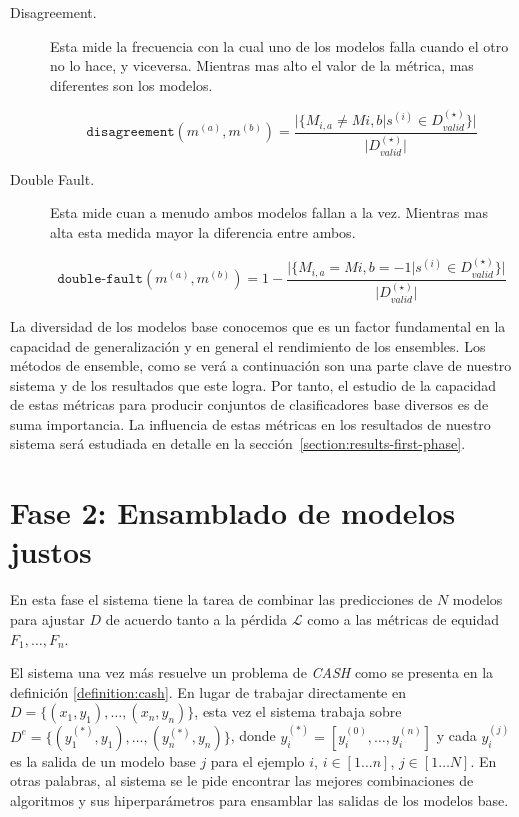 \begin{description}

    \item[Disagreement.]
    Esta mide la frecuencia con la cual uno de los modelos falla cuando el otro no lo hace, y viceversa.
    Mientras mas alto el valor de la métrica, mas diferentes son los modelos.

    \begin{equation}
        \texttt{disagreement}(m^{(a)}, m^{(b)}) = \frac{\vert\{M_{i,a} \neq M{i,b} \vert s^{(i)} \in D^{(\star)}_{valid}\}\vert}{\vert D^{(\star)}_{valid} \vert}
    \end{equation}

    \item[Double Fault.]
    Esta mide cuan a menudo ambos modelos fallan a la vez.
    Mientras mas alta esta medida mayor la diferencia entre ambos.

    \begin{equation}
        \texttt{double-fault}(m^{(a)}, m^{(b)}) = 1 - \frac{\vert\{M_{i,a} = M{i,b} = -1 \vert s^{(i)} \in D^{(\star)}_{valid}\}\vert}{\vert D^{(\star)}_{valid} \vert}
    \end{equation}
    
\end{description}

La diversidad de los modelos base conocemos que es un factor fundamental en la capacidad de generalización y en general el rendimiento de los ensembles.
Los métodos de ensemble, como se verá a continuación son una parte clave de nuestro sistema y de los resultados que este logra.
Por tanto, el estudio de la capacidad de estas métricas para producir conjuntos de clasificadores base diversos es de suma importancia.
La influencia de estas métricas en los resultados de nuestro sistema será estudiada en detalle en la sección~\ref{section:results-first-phase}.

\section{Fase 2: Ensamblado de modelos justos}\label{section:second-phase}

En esta fase el sistema tiene la tarea de combinar las predicciones de $N$ modelos para ajustar $D$ de acuerdo tanto a la pérdida $\mathcal{L}$ como a las métricas de equidad $F_1, \dots, F_n$.

El sistema una vez más resuelve un problema de \emph{CASH} como se presenta en la definición \ref{definition:cash}.
En lugar de trabajar directamente en $D = \{(x_1,y_1),\dots, (x_n,y_n)\}$, esta vez el sistema trabaja sobre $D^e = \{(y_1^{(*)}, y_1),\dots,(y_n^{(*)}, y_n)\}$, donde $y_i^{(*)} = [y_i^{(0)},\dots,y_i^{(n)}]$ y cada $y_i^{(j)}$ es la salida de un modelo base $j$ para el ejemplo $i$, $i\in[1 \dots n]$, $j\in[1 \dots N]$.
En otras palabras, al sistema se le pide encontrar las mejores combinaciones de algoritmos y sus hiperparámetros para ensamblar las salidas de los modelos base.


